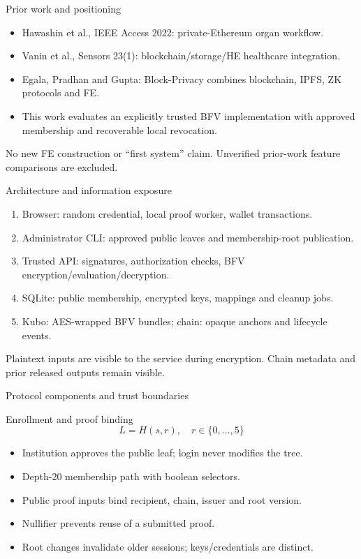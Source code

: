 \documentclass[10pt]{beamer}
\begin{document}
\begin{frame}{Prior work and positioning}
\begin{itemize}
\item Hawashin et al., IEEE Access 2022: private-Ethereum organ workflow.
\item Vanin et al., Sensors 23(1): blockchain/storage/HE healthcare integration.
\item Egala, Pradhan and Gupta: Block-Privacy combines blockchain, IPFS, ZK protocols and FE.
\item This work evaluates an explicitly trusted BFV implementation with approved membership and recoverable local revocation.
\end{itemize}
No new FE construction or ``first system'' claim. Unverified prior-work feature comparisons are excluded.
\end{frame}
\begin{frame}{Architecture and information exposure}
\begin{enumerate}
\item Browser: random credential, local proof worker, wallet transactions.
\item Administrator CLI: approved public leaves and membership-root publication.
\item Trusted API: signatures, authorization checks, BFV encryption/evaluation/decryption.
\item SQLite: public membership, encrypted keys, mappings and cleanup jobs.
\item Kubo: AES-wrapped BFV bundles; chain: opaque anchors and lifecycle events.
\end{enumerate}
Plaintext inputs are visible to the service during encryption. Chain metadata and prior released outputs remain visible.
\end{frame}
\begin{frame}{Protocol components and trust boundaries}
\begin{center}\begin{minipage}{.72\linewidth}

\end{minipage}\end{center}
\end{frame}
\begin{frame}{Enrollment and proof binding}
\[
L=H(s,r),\quad r\in\{0,\ldots,5\}
\]
\begin{itemize}
\item Institution approves the public leaf; login never modifies the tree.
\item Depth-20 membership path with boolean selectors.
\item Public proof inputs bind recipient, chain, issuer and root version.
\item Nullifier prevents reuse of a submitted proof.
\item Root changes invalidate older sessions; keys/credentials are distinct.
\end{itemize}
\end{frame}
\end{document}
